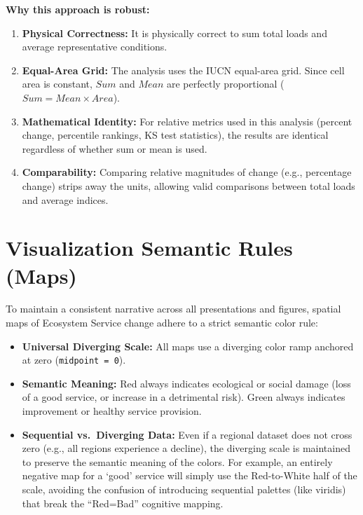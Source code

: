 \documentclass[
  letterpaper,
  DIV=11,
  numbers=noendperiod]{scrreprt}
\providecommand{\tightlist}{%
  \setlength{\itemsep}{0pt}\setlength{\parskip}{0pt}}
\begin{document}
\textbf{Why this approach is robust:}

\begin{enumerate}
\def\labelenumi{\arabic{enumi}.}
\tightlist
\item
  \textbf{Physical Correctness:} It is physically correct to sum total
  loads and average representative conditions.
\item
  \textbf{Equal-Area Grid:} The analysis uses the IUCN equal-area grid.
  Since cell area is constant, \(Sum\) and \(Mean\) are perfectly
  proportional (\(Sum = Mean \times Area\)).
\item
  \textbf{Mathematical Identity:} For relative metrics used in this
  analysis (percent change, percentile rankings, KS test statistics),
  the results are identical regardless of whether sum or mean is used.
\item
  \textbf{Comparability:} Comparing relative magnitudes of change (e.g.,
  percentage change) strips away the units, allowing valid comparisons
  between total loads and average indices.
\end{enumerate}

\section{Visualization Semantic Rules
(Maps)}\label{visualization-semantic-rules-maps}

To maintain a consistent narrative across all presentations and figures,
spatial maps of Ecosystem Service change adhere to a strict semantic
color rule:

\begin{itemize}
\tightlist
\item
  \textbf{Universal Diverging Scale:} All maps use a diverging color
  ramp anchored at zero (\texttt{midpoint\ =\ 0}).
\item
  \textbf{Semantic Meaning:} Red always indicates ecological or social
  damage (loss of a good service, or increase in a detrimental risk).
  Green always indicates improvement or healthy service provision.
\item
  \textbf{Sequential vs.~Diverging Data:} Even if a regional dataset
  does not cross zero (e.g., all regions experience a decline), the
  diverging scale is maintained to preserve the semantic meaning of the
  colors. For example, an entirely negative map for a `good' service
  will simply use the Red-to-White half of the scale, avoiding the
  confusion of introducing sequential palettes (like viridis) that break
  the ``Red=Bad'' cognitive mapping.
\end{itemize}
\end{document}
